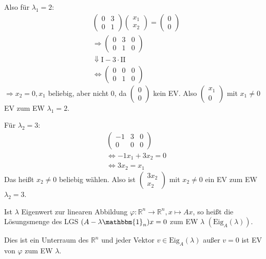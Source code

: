 Also für $\lambda_1 = 2$:
\begin{align*}
	&\begin{pmatrix}0 & 3 \\ 0 & 1\end{pmatrix}\begin{pmatrix}x_1 \\ x_2\end{pmatrix} = \begin{pmatrix}0\\0\end{pmatrix} \\
	&\Rightarrow \left(\begin{array}{cc|c}0 & 3 & 0 \\ 0 & 1 & 0\end{array}\right) \\
	&\Downarrow \text{I} - 3 \cdot \text{II} \\
	&\Leftrightarrow \left(\begin{array}{cc|c}0 & 0 & 0 \\ 0 & 1 & 0\end{array}\right)
\end{align*}
$\Rightarrow x_2 = 0, x_1$ beliebig, aber nicht $0$, da $\begin{pmatrix}0\\0\end{pmatrix}$ kein EV. Also $\begin{pmatrix}x_1\\0\end{pmatrix}$ mit $x_1 \neq 0$ EV zum EW $\lambda _1 = 2$.

Für $\lambda_2 = 3$:
\begin{align*}
	&\left(\begin{array}{cc|c}-1 & 3 & 0 \\ 0 & 0 & 0\end{array}\right) \\
	&\Leftrightarrow -1x_1 + 3x_2 = 0 \\
	&\Leftrightarrow 3x_2 = x_1
\end{align*}
Das heißt $x_2 \neq 0$ beliebig wählen. Also ist $\begin{pmatrix}3x_2\\x_2\end{pmatrix}$ mit $x_2 \neq 0$ ein EV zum EW $\lambda _2 = 3$.

Ist $\lambda$ Eigenwert zur linearen Abbildung $\varphi : \mathbb{R}^n \rightarrow \mathbb{R}^n, x \mapsto Ax$, so heißt die Lösungsmenge des LGS $(A - \lambda \mathbbm{1}_n)x = 0$  zum EW $\lambda$ $(\text{Eig}_A(\lambda))$.

Dies ist ein Unterraum des $\mathbb{R}^n$ und jeder Vektor $v \in \text{Eig}_A(\lambda)$ außer $v = 0$ ist EV von $\varphi$ zum EW $\lambda$.




